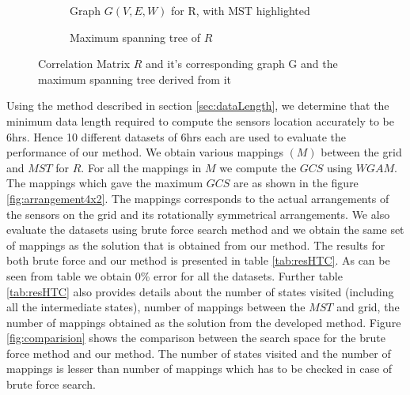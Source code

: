 \begin{figure}[!ht]
\begin{subfigure}[b]{0.5\textwidth}
\centering
\caption {Graph $G(V,E,W)$ for R, with MST highlighted}
\label{fig:corrMatTree}
\end{subfigure}
\hfill
\begin{subfigure}[b]{0.3\textwidth}
\caption{Maximum spanning tree of $R$}
\label{fig:corrMST}
\end{subfigure}
\centering
\caption{Correlation Matrix $R$ and it's corresponding graph G and the maximum spanning tree derived from it}
\label{fig:materFig}
\end{figure}
Using the method described in section \ref{sec:dataLength}, we determine that the minimum data length required to compute the sensors location accurately to be 6hrs.
Hence 10 different datasets of 6hrs each are used to evaluate the performance of our method.
We obtain various mappings $(M)$ between the grid and $MST$ for $R$.
For all the mappings in $M$ we compute the $GCS$ using $WGAM$. The mappings which gave the maximum $GCS$ are as shown in the figure \ref{fig:arrangement4x2}.
The mappings corresponds to the actual arrangements of the sensors on the grid and its rotationally symmetrical arrangements.
We also evaluate the datasets using brute force search method and we obtain the same set of mappings as the solution that is obtained from our method. The results for both brute force and our method is presented in table \ref{tab:resHTC}.
As can be seen from table we obtain 0\% error for all the datasets. 
Further table \ref{tab:resHTC} also provides details about the number of states visited (including all the intermediate states), number of mappings between the $MST$ and grid, the number of mappings obtained as the solution from the developed method. 
Figure \ref{fig:comparision} shows the comparison between the search space for the brute force method and our method. 
The number of states visited and the number of mappings is lesser than number of  mappings which has to be checked in case of brute force search. 
